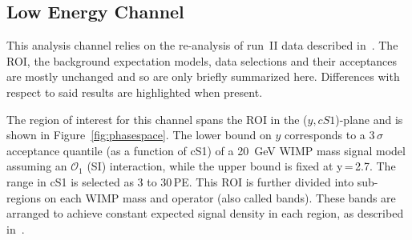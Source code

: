 
\subsection{Low Energy Channel}
\label{subsec:LowE}
This analysis channel relies on the re-analysis of run~II data described in~\cite{xe100_run_combination}. The ROI, the background 
expectation models, data selections and their acceptances are mostly unchanged and so are only briefly summarized here. Differences with respect to said results are highlighted when present.

The region of interest for this channel spans the ROI in the ($y,cS1$)-plane and is shown in Figure~\ref{fig:phasespace}.  The lower 
bound on $y$ corresponds to a 3\,$\sigma$ acceptance quantile (as a function of cS1) of a 20~GeV WIMP mass signal model assuming an $\mathcal{O}_1$ (SI) interaction, while the upper bound is fixed at y\,=\,2.7.
The range in cS1 is selected as 3 to 30\,PE. This ROI is further divided into sub-regions on each WIMP mass and operator (also called bands). These bands are arranged to achieve constant expected signal density in each region, as described in~\cite{xe100_run_combination}.

